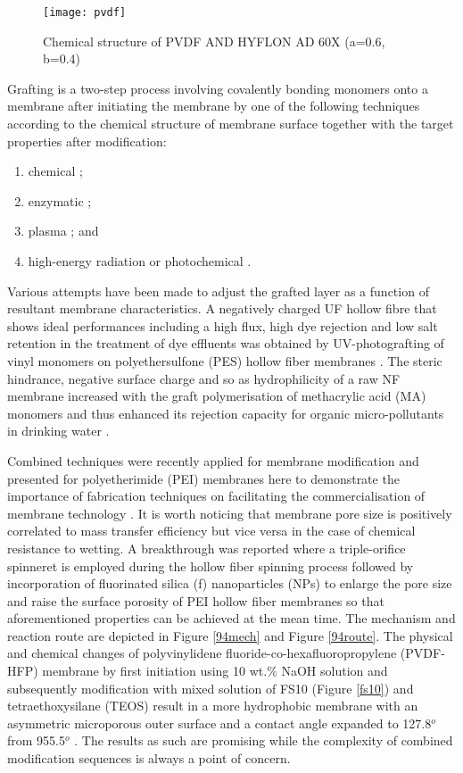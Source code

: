 \documentclass[a4paper,12pt]{report}
\begin{document}
\begin{figure}[h!]
\centering
  \texttt{[image: pvdf]}
  \caption{Chemical structure of PVDF AND HYFLON AD 60X (a=0.6, b=0.4)}
  \label{pvdf}
\end{figure}

Grafting is a two-step process involving covalently bonding monomers onto a membrane after initiating the membrane by one of the following techniques according to the chemical structure of membrane surface together with the target properties after modification: 
\begin{enumerate}
\item chemical \citep{05red}; 
\item enzymatic \citep{06tsu}; 
\item plasma \citep{77tur}; and 
\item high-energy radiation or photochemical \citep{08dai, 10abu, 08mina}.
\end{enumerate}

Various attempts have been made to adjust the grafted layer as a function of resultant membrane characteristics. A negatively charged UF hollow fibre that shows ideal performances including a high flux, high dye rejection and low salt retention in the treatment of dye effluents was obtained by UV-photografting of vinyl monomers on polyethersulfone (PES) hollow fiber membranes \citep{79akb}. The steric hindrance, negative surface charge and so as hydrophilicity of a raw NF membrane increased with the graft polymerisation of methacrylic acid (MA) monomers and thus enhanced its rejection capacity for organic micro-pollutants in drinking water \citep{80kim}.

Combined techniques were recently applied for membrane modification and presented for polyetherimide (PEI) membranes here to demonstrate the importance of fabrication techniques on facilitating the commercialisation of membrane technology \citep{94azhang, 94bzhang}. It is worth noticing that membrane pore size is positively correlated to mass transfer efficiency but vice versa in the case of chemical resistance to wetting. A breakthrough was reported where a triple-orifice spinneret is employed during the hollow fiber spinning process followed by incorporation of fluorinated silica (f) nanoparticles (NPs) to enlarge the pore size and raise the surface porosity of PEI hollow fiber membranes so that aforementioned properties can be achieved at the mean time. The mechanism and reaction route are depicted in Figure \ref{94mech} and Figure \ref{94route}. The physical and chemical changes of polyvinylidene fluoride-co-hexafluoropropylene (PVDF-HFP) membrane by first initiation using 10 wt.\% NaOH solution and subsequently modification with mixed solution of FS10 (Figure \ref{fs10}) and tetraethoxysilane (TEOS) result in a more hydrophobic membrane with an asymmetric microporous outer surface and a contact angle expanded to 127.8$^o$ from 955.5$^o$ \citep{83wong}. The results as such are promising while the complexity of combined modification sequences is always a point of concern.
\end{document}
